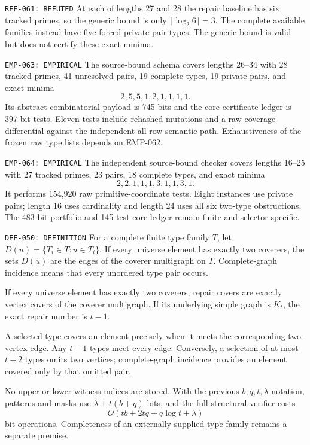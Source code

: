 \documentclass[11pt]{article}
\begin{document}
{\texttt{REF-061: REFUTED}}
At each of lengths 27 and 28 the repair baseline has six tracked primes, so
the generic bound is only \(\lceil\log_2 6\rceil=3\).  The complete available
families instead have five forced private-pair types.  The generic bound is
valid but does not certify these exact minima.

{\texttt{EMP-063: EMPIRICAL}}
The source-bound schema covers lengths 26--34 with 28 tracked primes, 41
unresolved pairs, 19 complete types, 19 private pairs, and exact minima
\[
 2,5,5,1,2,1,1,1,1.
\]
Its abstract combinatorial payload is 745 bits and the core certificate
ledger is 397 bit tests.  Eleven tests include rehashed mutations and a raw
coverage differential against the independent all-row semantic path.
Exhaustiveness of the frozen raw type lists depends on EMP-062.

{\texttt{EMP-064: EMPIRICAL}}
The independent source-bound checker covers lengths 16--25 with 27 tracked
primes, 23 pairs, 18 complete types, and exact minima
\[
 2,2,1,1,1,3,1,1,3,1.
\]
It performs 154,920 raw primitive-coordinate tests.  Eight instances use
private pairs; length 16 uses cardinality and length 24 uses all six
two-type obstructions.  The 483-bit portfolio and 145-test core ledger remain
finite and selector-specific.

{\texttt{DEF-050: DEFINITION}}
For a complete finite type family \(T\), let
\(D(u)=\{T_i\in T:u\in T_i\}\).  If every universe element has exactly two
coverers, the sets \(D(u)\) are the edges of the coverer multigraph on \(T\).
Complete-graph incidence means that every unordered type pair occurs.

{}
If every universe element has exactly two coverers, repair covers are exactly
vertex covers of the coverer multigraph.  If its underlying simple graph is
\(K_t\), the exact repair number is \(t-1\).

\begin{claimproof}
A selected type covers an element precisely when it meets the corresponding
two-vertex edge.  Any \(t-1\) types meet every edge.  Conversely, a selection
of at most \(t-2\) types omits two vertices; complete-graph incidence provides
an element covered only by that omitted pair.

No upper or lower witness indices are stored.  With the previous
\(b,q,t,\lambda\) notation, patterns and masks use
\(\lambda+t(b+q)\) bits, and the full structural verifier costs
\[
 O(tb+2tq+q\log t+\lambda)
\]
bit operations.  Completeness of an externally supplied type family remains
a separate premise.
\end{claimproof}
\end{document}
